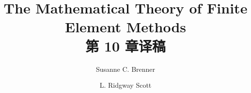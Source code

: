 \documentclass[a4paper,UTF8,12pt]{ctexart}
\title{The Mathematical Theory of Finite Element Methods\\第 10 章译稿}
\author{Susanne C. Brenner \and L. Ridgway Scott}
\date{}
\begin{document}
\maketitle
\setcounter{section}{9}
\renewcommand{\thethmcount}{\thesubsection.\arabic{thmcount}}
\renewcommand{\theequation}{\thesubsection.\arabic{equation}}
\renewcommand{\thefigure}{\thesection.\arabic{figure}}
\renewcommand{\thetable}{\thesection.\arabic{table}}

\end{document}

